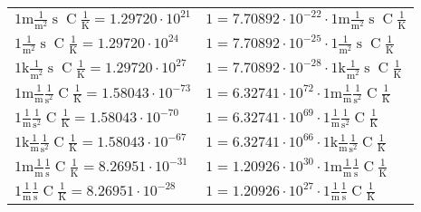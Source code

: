 \begin{center}
\begin{longtable}{l l}
{\color{gray}$1 \bm{\mathrm{ m}}\frac1{\operatorname{m}^2}{\operatorname{s}}{\operatorname{C}}\frac1{\operatorname{K}} = 1.29720\cdot10^{21} $}   & {\color{gray}$ 1 = 7.70892\cdot10^{-22} \cdot 1 \bm{\mathrm{ m}}\frac1{\operatorname{m}^2}{\operatorname{s}}{\operatorname{C}}\frac1{\operatorname{K}}$}  \\
{\color{black}$1 \bm{\mathrm{ }}\frac1{\operatorname{m}^2}{\operatorname{s}}{\operatorname{C}}\frac1{\operatorname{K}} = 1.29720\cdot10^{24} $}   & {\color{black}$ 1 = 7.70892\cdot10^{-25} \cdot 1 \bm{\mathrm{ }}\frac1{\operatorname{m}^2}{\operatorname{s}}{\operatorname{C}}\frac1{\operatorname{K}}$}  \\
{\color{gray}$1 \bm{\mathrm{ k}}\frac1{\operatorname{m}^2}{\operatorname{s}}{\operatorname{C}}\frac1{\operatorname{K}} = 1.29720\cdot10^{27} $}   & {\color{gray}$ 1 = 7.70892\cdot10^{-28} \cdot 1 \bm{\mathrm{ k}}\frac1{\operatorname{m}^2}{\operatorname{s}}{\operatorname{C}}\frac1{\operatorname{K}}$}  \\
{\color{gray}$1 \bm{\mathrm{ m}}\frac1{\operatorname{m}}\frac1{\operatorname{s}^2}{\operatorname{C}}\frac1{\operatorname{K}} = 1.58043\cdot10^{-73} $}   & {\color{gray}$ 1 = 6.32741\cdot10^{72} \cdot 1 \bm{\mathrm{ m}}\frac1{\operatorname{m}}\frac1{\operatorname{s}^2}{\operatorname{C}}\frac1{\operatorname{K}}$}  \\
{\color{black}$1 \bm{\mathrm{ }}\frac1{\operatorname{m}}\frac1{\operatorname{s}^2}{\operatorname{C}}\frac1{\operatorname{K}} = 1.58043\cdot10^{-70} $}   & {\color{black}$ 1 = 6.32741\cdot10^{69} \cdot 1 \bm{\mathrm{ }}\frac1{\operatorname{m}}\frac1{\operatorname{s}^2}{\operatorname{C}}\frac1{\operatorname{K}}$}  \\
{\color{gray}$1 \bm{\mathrm{ k}}\frac1{\operatorname{m}}\frac1{\operatorname{s}^2}{\operatorname{C}}\frac1{\operatorname{K}} = 1.58043\cdot10^{-67} $}   & {\color{gray}$ 1 = 6.32741\cdot10^{66} \cdot 1 \bm{\mathrm{ k}}\frac1{\operatorname{m}}\frac1{\operatorname{s}^2}{\operatorname{C}}\frac1{\operatorname{K}}$}  \\
{\color{gray}$1 \bm{\mathrm{ m}}\frac1{\operatorname{m}}\frac1{\operatorname{s}}{\operatorname{C}}\frac1{\operatorname{K}} = 8.26951\cdot10^{-31} $}   & {\color{gray}$ 1 = 1.20926\cdot10^{30} \cdot 1 \bm{\mathrm{ m}}\frac1{\operatorname{m}}\frac1{\operatorname{s}}{\operatorname{C}}\frac1{\operatorname{K}}$}  \\
{\color{black}$1 \bm{\mathrm{ }}\frac1{\operatorname{m}}\frac1{\operatorname{s}}{\operatorname{C}}\frac1{\operatorname{K}} = 8.26951\cdot10^{-28} $}   & {\color{black}$ 1 = 1.20926\cdot10^{27} \cdot 1 \bm{\mathrm{ }}\frac1{\operatorname{m}}\frac1{\operatorname{s}}{\operatorname{C}}\frac1{\operatorname{K}}$}  \\

\end{longtable}
\end{center}
